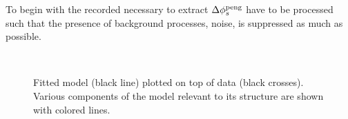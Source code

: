 To begin with the recorded necessary to extract $\Delta\phi_{s}^{\tiny\text{peng}}$ have to be processed such that
the presence of background processes, noise, is suppressed as much as possible.

%
%

\begin{figure}[!t]
  \begin{subfigure}{0.5\textwidth}
    \centering
    \scalebox{1.2}{}
  \end{subfigure}%
  \hfill
  \begin{subfigure}{0.5\textwidth}
    \centering
    \scalebox{1.2}{}
  \end{subfigure}\\
  \begin{subfigure}{\textwidth}
    \centering
    \scalebox{1.2}{}
  \end{subfigure}
  \caption{Fitted model (black line) plotted on top of \BsJpsiKst data (black crosses).
           Various components of the model relevant to its \CP structure are shown with colored lines.}
  \label{app_angular_plot_thetas}
\end{figure}

